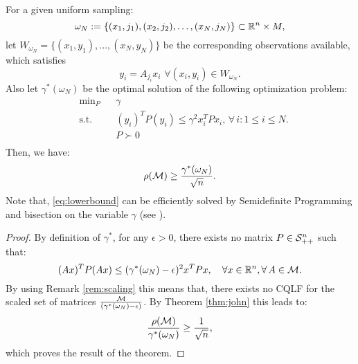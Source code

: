 \begin{theorem}
For a given uniform sampling: $$\omega_N := \{(x_1, j_1), (x_2, j_2), \ldots, (x_N, j_N)\} \subset \mathbb{R}^n \times M,$$ let $W_{\omega_N}=\{(x_1,y_1),...,(x_N,y_N)\}$ be the corresponding observations available, which satisfies $$y_i= A_{j_i}x_i\,\, \forall (x_i, y_i) \in W_{\omega_N}.$$
Also let $\gamma^*(\omega_N)$ be the optimal solution of the following optimization problem:
\begin{equation}\label{eq:lowerbound}
\begin{aligned}
& \text{min}_P & & \gamma \\
& \text{s.t.} 
&  & (y_i)^T P (y_i) \leq \gamma^2 x_i^TPx_i,\,  \forall \,i :1\leq i \leq N.\\
& && P \succ 0 \\
\end{aligned}
\end{equation}
Then, we have:
$$\rho(\mathcal{M}) \geq \frac{\gamma^*(\omega_N)}{\sqrt{n}}.$$ Note that, \eqref{eq:lowerbound} can be efficiently solved by Semidefinite Programming and bisection on the variable $\gamma$ (see \cite{boyd}).

\end{theorem}
\begin{proof}
By definition of $\gamma^*$, for any $\epsilon > 0$, there exists no matrix $P \in \mathcal{S}^n_{++}$ such that:
\begin{equation*}(Ax)^T P (Ax) \leq (\gamma^*(\omega_N) -\epsilon)^2x^TPx,\quad \forall x \in \mathbb{R}^n, \forall\, A \in \mathcal{M}.
\end{equation*}
By using Remark \ref{rem:scaling} this means that, there exists no CQLF for the scaled set of matrices $\frac{\mathcal{M}}{(\gamma^*(\omega_N)-\epsilon)}$. By Theorem \ref{thm:john} this leads to:
\begin{equation*}\frac{\rho(\mathcal{M})}{\gamma^*(\omega_N)} \geq \frac{1}{\sqrt{n}},\end{equation*}
which proves the result of the theorem.
\end{proof}